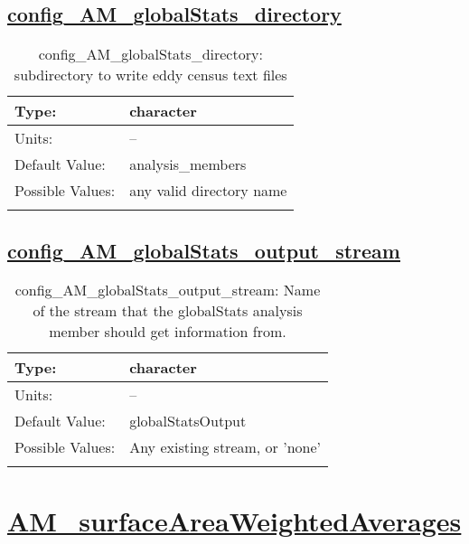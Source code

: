 \subsection[config\_AM\_globalStats\_directory]{\hyperref[sec:nm_tab_AM_globalStats]{config\_AM\_globalStats\_directory}}
\label{subsec:nm_sec_config_AM_globalStats_directory}
\begin{center}
\begin{longtable}{| p{2.0in} || p{4.0in} |}
    \hline
    Type: & character \\
    \hline
    Units: & -- \\
    \hline
    Default Value: & analysis\_members \\
    \hline
    Possible Values: & any valid directory name \\
    \hline
    \caption{config\_AM\_globalStats\_directory: subdirectory to write eddy census text files}
\end{longtable}
\end{center}
\subsection[config\_AM\_globalStats\_output\_stream]{\hyperref[sec:nm_tab_AM_globalStats]{config\_AM\_globalStats\_output\_stream}}
\label{subsec:nm_sec_config_AM_globalStats_output_stream}
\begin{center}
\begin{longtable}{| p{2.0in} || p{4.0in} |}
    \hline
    Type: & character \\
    \hline
    Units: & -- \\
    \hline
    Default Value: & globalStatsOutput \\
    \hline
    Possible Values: & Any existing stream, or 'none' \\
    \hline
    \caption{config\_AM\_globalStats\_output\_stream: Name of the stream that the globalStats analysis member should get information from.}
\end{longtable}
\end{center}
\section[AM\_surfaceAreaWeightedAverages]{\hyperref[sec:nm_tab_AM_surfaceAreaWeightedAverages]{AM\_surfaceAreaWeightedAverages}}
\label{sec:nm_sec_AM_surfaceAreaWeightedAverages}
